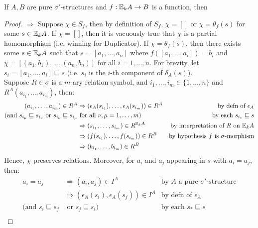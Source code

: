 \begin{thm}
If $A,B$ are pure $\sigma'$-structures and $f:{\mathbb{E}_{k}A} \rightarrow B$ is a function, then 
\begin{proof}
$\Rightarrow$ Suppose $\chi \in S_{f}$, then by definition of $S_{f}$, $\chi = []$ or $\chi = \theta_{f}(s)$ for some $s \in {\mathbb{E}_{k}A}$. If $\chi = []$, then it is vacuously true that $\chi$ is a partial homomorphism (i.e. winning for Duplicator). If $\chi = \theta_{f}(s)$, then there exists some $s \in {\mathbb{E}_{k}A}$ such that $s = [a_{1},\dots,a_{n}]$ where $f([a_{1},\dots,a_{i}]) = b_{i}$ and $\chi = [(a_{1},b_{1}),\dots,(a_{n},b_{n})]$ for all $i = 1,\dots,n$. For brevity, let $s_{i} = [a_{1},\dots,a_{i}] \sqsubseteq s$ (i.e. $s_{i}$ is the $i$-th component of $\delta_{A}(s)$). \\
Suppose $R \in \sigma$ is a $m$-ary relation symbol, and $i_{1},\dots,i_{m} \in \{1,\dots,n\}$ and $R^{A}(a_{i_{1}},\dots,a_{i_{m}})$, then:
\begin{align*}
(a_{i_{1}},\dots,a_{i_{m}}) \in R^{A} &\Rightarrow (\epsilon_{A}(s_{i_{1}}),\dots,\epsilon_{A}(s_{i_{m}})) \in R^{A} & \text{by defn of $\epsilon_{A}$} \\
\text{(and } s_{i_{\mu}} \sqsubseteq s_{i_{\nu}} \text{ or } s_{i_{\nu}} \sqsubseteq s_{i_{\mu}} &\text{ for all } \nu,\mu = 1,\dots,m\text{)} &\text{by each } s_{i_{*}} \sqsubseteq s \\
&\Rightarrow (s_{i_{1}},\dots,s_{i_{m}}) \in R^{{\mathbb{E}_{k}A}} & \text{by interpretation of $R$ on ${\mathbb{E}_{k}A}$} \\
&\Rightarrow (f(s_{i_{1}}),\dots,f(s_{i_{m}})) \in R^{B} & \text{by hypothesis $f$ is $\sigma$-morphism}\\
&\Rightarrow (b_{i_{1}},\dots,b_{i_{m}}) \in R^{B}
\end{align*}
Hence, $\chi$ preserves relations.
Moreover, for $a_{i}$ and $a_{j}$ appearing in $s$ with $a_{i} = a_{j}$, then:
\begin{align*}
a_{i} = a_{j}       &\Rightarrow (a_{i},a_{j}) \in I^{A} & \text{by $A$ a pure $\sigma'$-structure} \\
&\Rightarrow (\epsilon_{A}(s_{i}),\epsilon_{A}(s_{j})) \in I^{A} & \text{by defn of $\epsilon_{A}$} \\
\text{(and } s_{i} \sqsubseteq s_{j} &\text{ or } s_{j} \sqsubseteq s_{i}\text{)} &\text{by each } s_{*} \sqsubseteq s \\

\end{align*}
\end{proof}
\end{thm}
